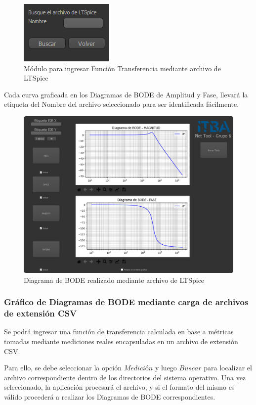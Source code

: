 \begin{figure}[!htb] 
    \centering 
    \includegraphics [scale=0.8]{../EJ2/LatexScreenshots/plotToolSpiceFunctionInput.png} 
    \caption{Módulo para ingresar Función Transferencia mediante archivo de LTSpice}
    \label{fig:spiceFunctionInputPlotTool}
\end{figure}

Cada curva graficada en los Diagramas de BODE de Amplitud y Fase, llevará la etiqueta del Nombre del archivo seleccionado para ser identificada fácilmente.

\begin{figure}[!htb] 
    \centering 
    \includegraphics [width=0.8
    \textwidth] {../EJ2/LatexScreenshots/plotToolSpice.png} 
    \caption{Diagrama de BODE realizado mediante archivo de LTSpice}
    \label{fig:spiceFunctionPlotTool}
\end{figure}

\subsubsection{Gráfico de Diagramas de BODE mediante carga de archivos de extensión CSV}

Se podrá ingresar una función de transferencia calculada en base a métricas tomadas mediante mediciones reales encapsuladas en un archivo de extensión CSV.

Para ello, se debe seleccionar la opción $Medición$ y luego $Buscar$ para localizar el archivo correspondiente dentro de los directorios del sistema operativo. 
Una vez seleccionado, la aplicación procesará el archivo, y si el formato del mismo es válido procederá a realizar los Diagramas de BODE correspondientes.

